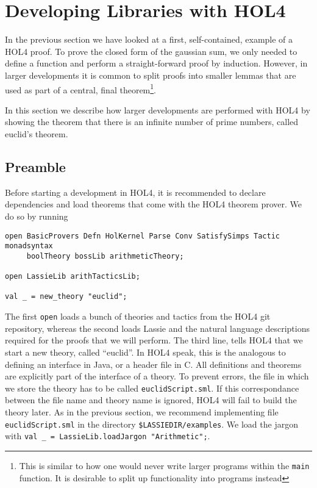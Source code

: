 \section{Developing Libraries with HOL4}\label{sec:libraries}

In the previous section we have looked at a first, self-contained, example of a
HOL4 proof.
To prove the closed form of the gaussian sum, we only needed to define a function
and perform a straight-forward proof by induction.
However, in larger developments it is common to split proofs into smaller
lemmas that are used as part of a central, final theorem\footnote{This is similar to how one would never write larger programs within the \texttt{main} function. It is desirable to split up functionality into programs instead}.

In this section we describe how larger developments are performed with HOL4 by
showing the theorem that there is an infinite number of prime numbers, called
euclid's theorem.

\subsection{Preamble}
Before starting a development in HOL4, it is recommended to declare dependencies
and load theorems that come with the HOL4 theorem prover.
We do so by running

\begin{lstlisting}
open BasicProvers Defn HolKernel Parse Conv SatisfySimps Tactic monadsyntax
     boolTheory bossLib arithmeticTheory;

open LassieLib arithTacticsLib;

val _ = new_theory "euclid";
\end{lstlisting}

The first \lstinline{open} loads a bunch of theories and tactics from the HOL4
git repository, whereas the second loads Lassie and the natural language
descriptions required for the proofs that we will perform.
The third line, tells HOL4 that we start a new theory, called ``euclid''.
In HOL4 speak, this is the analogous to defining an interface in Java, or a
header file in C.
All definitions and theorems are explicitly part of the interface of a theory.
To prevent errors, the file in which we store the theory has to be called
\lstinline{euclidScript.sml}.
If this correspondance between the file name and theory name is ignored,
HOL4 will fail to build the theory later.
As in the previous section, we recommend implementing file \lstinline{euclidScript.sml}
in the directory \texttt{\$LASSIEDIR/examples}.
We load the jargon with \lstinline{val _ = LassieLib.loadJargon "Arithmetic";}.

